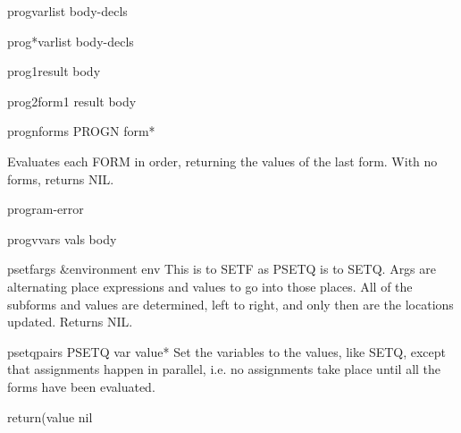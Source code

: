 \begin{macro}{prog}{varlist \body body-decls}{}
  
\end{macro}

\begin{macro}{prog*}{varlist \body body-decls}{}
  
\end{macro}

\begin{macro}{prog1}{result \body body}{}
  
\end{macro}

\begin{macro}{prog2}{form1 result \body body}{}
  
\end{macro}

\begin{specialop}{progn}{\rest forms}{}
  PROGN form*

Evaluates each FORM in order, returning the values of the last form. With no
forms, returns NIL.
\end{specialop}

\begin{condition-type}{program-error}{}{}
  
\end{condition-type}

\begin{specialop}{progv}{vars vals \body body}{}
  
\end{specialop}

\begin{macro}{psetf}{\rest args &environment env}{}
  This is to SETF as PSETQ is to SETQ. Args are alternating place
  expressions and values to go into those places. All of the subforms and
  values are determined, left to right, and only then are the locations
  updated. Returns NIL.
\end{macro}

\begin{macro}{psetq}{\rest pairs}{}
  PSETQ {var value}*
   Set the variables to the values, like SETQ, except that assignments
   happen in parallel, i.e. no assignments take place until all the
   forms have been evaluated.
\end{macro}

\begin{macro}{return}{\op (value nil}{}
  
\end{macro}

